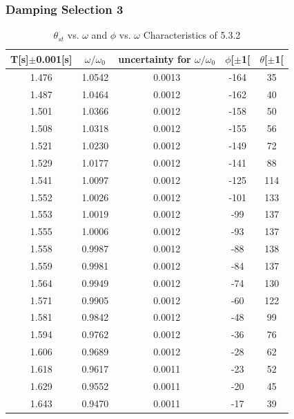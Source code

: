 \documentclass[12pt,a4paper]{article}
\begin{document}
\subsubsection{Damping Selection 3}
    \begin{table}[H]
  \centering
  \begin{tabular}{|c|c|c|c|c|}
  \hline
  T[s]$\pm$0.001[s]& $\omega/\omega_0$ & uncertainty for $\omega/\omega_0$ & $\phi${[}\degree{]}$\pm$1{[}\degree{]} & $\theta${[}\degree{]}$\pm$1{[}\degree{]} \\ \hline
  1.476   & 1.0542& 0.0013   & -164  & 35\\ \hline
  1.487   & 1.0464& 0.0012   & -162  & 40\\ \hline
  1.501   & 1.0366& 0.0012   & -158  & 50\\ \hline
  1.508   & 1.0318& 0.0012   & -155  & 56\\ \hline
  1.521   & 1.0230& 0.0012   & -149  & 72\\ \hline
  1.529   & 1.0177& 0.0012   & -141  & 88\\ \hline
  1.541   & 1.0097& 0.0012   & -125  & 114\\ \hline
  1.552   & 1.0026& 0.0012   & -101  & 133\\ \hline
  1.553   & 1.0019& 0.0012   & -99   & 137\\ \hline
  1.555   & 1.0006& 0.0012   & -93   & 137\\ \hline
  1.558   & 0.9987& 0.0012   & -88   & 138\\ \hline
  1.559   & 0.9981& 0.0012   & -84   & 137\\ \hline
  1.564   & 0.9949& 0.0012   & -74   & 130\\ \hline
  1.571   & 0.9905& 0.0012   & -60   & 122\\ \hline
  1.581   & 0.9842& 0.0012   & -48   & 99\\ \hline
  1.594   & 0.9762& 0.0012   & -36   & 76\\ \hline
  1.606   & 0.9689& 0.0012   & -28   & 62\\ \hline
  1.618   & 0.9617& 0.0011   & -23   & 52\\ \hline
  1.629   & 0.9552& 0.0011   & -20   & 45\\ \hline
  1.643   & 0.9470& 0.0011   & -17   & 39\\ \hline
  \end{tabular}
  \caption{$\theta_{st}$ vs. $\omega$ and $\phi$ vs. $\omega$ Characteristics of 5.3.2}
  \end{table}
\end{document}
